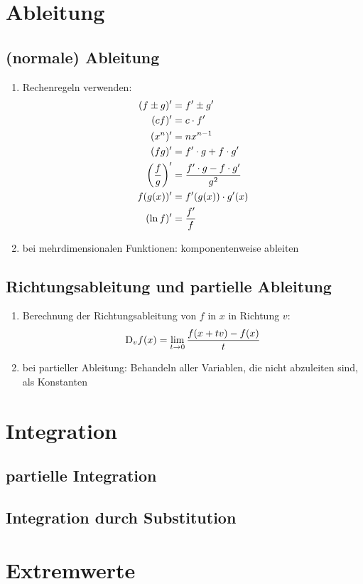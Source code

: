 \documentclass[ngerman,a4paper]{article}
\begin{document}
\section{Ableitung}
\subsection{(normale) Ableitung}
\begin{enumerate}[label=\textbf{\arabic*.}]
	\item Rechenregeln verwenden:
	\begin{align}
		(f\pm g)' &= f'\pm g'\notag \\
		(cf)' &= c\cdot f'\notag \\
		(x^n)' &= nx^{n-1}\notag \\
		(fg)' &= f'\cdot g + f\cdot g' \notag \\
		\left(\frac{f}{g}\right)' &= \frac{f'\cdot g-f\cdot g'}{g^2}\notag \\
		f(g(x))' &= f'(g(x))\cdot g'(x)\notag \\
		(\ln f)' &= \frac{f'}{f}\notag
	\end{align}
	\item bei mehrdimensionalen Funktionen: komponentenweise ableiten
\end{enumerate}

\subsection{Richtungsableitung und partielle Ableitung}
\begin{enumerate}[label=\textbf{\arabic*.}]
	\item Berechnung der Richtungsableitung von $f$ in $x$ in Richtung $v$:
	\begin{align}
		\mathrm{D}_vf(x)=\lim\limits_{t\to 0}\frac{f(x+tv)-f(x)}{t}\notag
	\end{align}
	\item bei partieller Ableitung: Behandeln aller Variablen, die nicht abzuleiten sind, als Konstanten
\end{enumerate}

\section{Integration}

\subsection{partielle Integration}

\subsection{Integration durch Substitution}

\section{Extremwerte}
\end{document}
